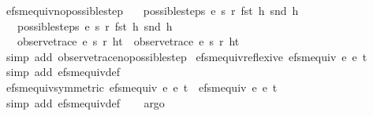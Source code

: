 \begin{isabellebody}
\ efsm{\isacharunderscore}equiv{\isacharunderscore}no{\isacharunderscore}possible{\isacharunderscore}step{\isacharcolon}\ \isanewline
\ \ {\isachardoublequoteopen}possible{\isacharunderscore}steps\ e{}\ s{}\ r{}\ {\isacharparenleft}fst\ h{\isacharparenright}\ {\isacharparenleft}snd\ h{\isacharparenright}\ {\isacharequal}\ {\isacharbraceleft}{\isacharbar}{\isacharbar}{\isacharbraceright}\ {\isasymLongrightarrow}\isanewline
\ \ \ possible{\isacharunderscore}steps\ e{}\ s{}\ r{}\ {\isacharparenleft}fst\ h{\isacharparenright}\ {\isacharparenleft}snd\ h{\isacharparenright}\ {\isacharequal}\ {\isacharbraceleft}{\isacharbar}{\isacharbar}{\isacharbraceright}\ {\isasymLongrightarrow}\isanewline
\ \ \ observe{\isacharunderscore}trace\ e{}\ s{}\ r{}\ {\isacharparenleft}h{\isacharhash}t{\isacharparenright}\ {\isacharequal}\ observe{\isacharunderscore}trace\ e{}\ s{}\ r{}\ {\isacharparenleft}h{\isacharhash}t{\isacharparenright}{\isachardoublequoteclose}\isanewline
%
\isadelimproof
\ \ %
\endisadelimproof
%
\isatagproof
{}\isamarkupfalse%
\ {\isacharparenleft}simp\ add{\isacharcolon}\ observe{\isacharunderscore}trace{\isacharunderscore}no{\isacharunderscore}possible{\isacharunderscore}step{\isacharparenright}%
\endisatagproof
{\isafoldproof}%
%
\isadelimproof
\isanewline
%
\endisadelimproof
\isanewline
{}\isamarkupfalse%
\ efsm{\isacharunderscore}equiv{\isacharunderscore}reflexive{\isacharcolon}\ {\isachardoublequoteopen}efsm{\isacharunderscore}equiv\ e{}\ e{}\ t{\isachardoublequoteclose}\isanewline
%
\isadelimproof
\ \ %
\endisadelimproof
%
\isatagproof
{}\isamarkupfalse%
\ {\isacharparenleft}simp\ add{\isacharcolon}\ efsm{\isacharunderscore}equiv{\isacharunderscore}def{\isacharparenright}%
\endisatagproof
{\isafoldproof}%
%
\isadelimproof
\isanewline
%
\endisadelimproof
\isanewline
{}\isamarkupfalse%
\ efsm{\isacharunderscore}equiv{\isacharunderscore}symmetric{\isacharcolon}\ {\isachardoublequoteopen}efsm{\isacharunderscore}equiv\ e{}\ e{}\ t\ {\isasymequiv}\ efsm{\isacharunderscore}equiv\ e{}\ e{}\ t{\isachardoublequoteclose}\isanewline
%
\isadelimproof
\ \ %
\endisadelimproof
%
\isatagproof
{}\isamarkupfalse%
\ {\isacharparenleft}simp\ add{\isacharcolon}\ efsm{\isacharunderscore}equiv{\isacharunderscore}def{\isacharparenright}\isanewline
\ \ \isamarkupfalse%
\ argo%

\end{isabellebody}
